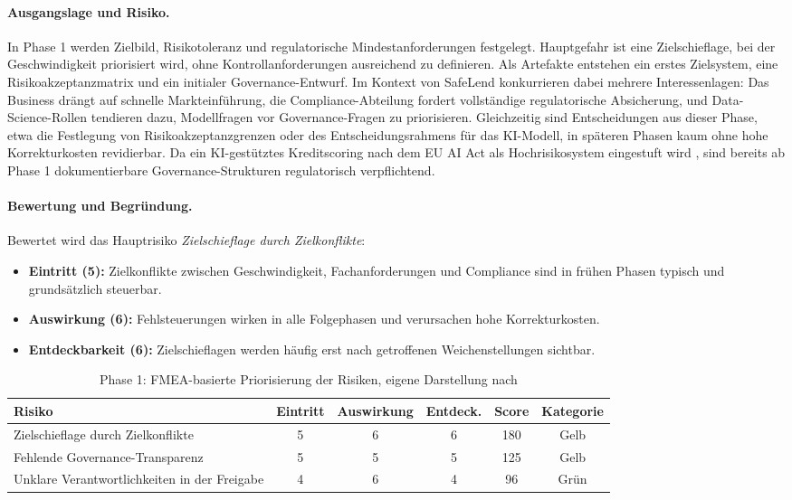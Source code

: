 \paragraph*{Ausgangslage und Risiko.}
In Phase 1 werden Zielbild, Risikotoleranz und regulatorische Mindestanforderungen festgelegt.
Hauptgefahr ist eine Zielschieflage, bei der Geschwindigkeit priorisiert wird,
ohne Kontrollanforderungen ausreichend zu definieren.
Als Artefakte entstehen ein erstes Zielsystem, eine Risikoakzeptanzmatrix und ein initialer Governance-Entwurf.
Im Kontext von SafeLend konkurrieren dabei mehrere Interessenlagen:
Das Business drängt auf schnelle Markteinführung,
die Compliance-Abteilung fordert vollständige regulatorische Absicherung,
und Data-Science-Rollen tendieren dazu, Modellfragen vor Governance-Fragen zu priorisieren.
Gleichzeitig sind Entscheidungen aus dieser Phase, etwa die Festlegung von Risikoakzeptanzgrenzen
oder des Entscheidungsrahmens für das KI-Modell,
in späteren Phasen kaum ohne hohe Korrekturkosten revidierbar.
Da ein KI-gestütztes Kreditscoring nach dem EU AI Act als Hochrisikosystem eingestuft wird \cite{EUAIAct2024},
sind bereits ab Phase 1 dokumentierbare Governance-Strukturen regulatorisch verpflichtend.

\paragraph*{Bewertung und Begründung.}
Bewertet wird das Hauptrisiko \textit{Zielschieflage durch Zielkonflikte}:
\begin{itemize}
  \item \textbf{Eintritt (5):} Zielkonflikte zwischen Geschwindigkeit, Fachanforderungen und Compliance sind in frühen Phasen typisch und grundsätzlich steuerbar.
  \item \textbf{Auswirkung (6):} Fehlsteuerungen wirken in alle Folgephasen und verursachen hohe Korrekturkosten.
  \item \textbf{Entdeckbarkeit (6):} Zielschieflagen werden häufig erst nach getroffenen Weichenstellungen sichtbar.
\end{itemize}

\begin{table}[!htbp]
\centering
\begin{tabular}{|p{5.5cm}|c|c|c|c|c|}
\hline
\textbf{Risiko} & \textbf{Eintritt} & \textbf{Auswirkung} & \textbf{Entdeck.} & \textbf{Score} & \textbf{Kategorie} \\
\hline
Zielschieflage durch Zielkonflikte & 5 & 6 & 6 & 180 & Gelb \\
Fehlende Governance-Transparenz & 5 & 5 & 5 & 125 & Gelb \\
Unklare Verantwortlichkeiten in der Freigabe & 4 & 6 & 4 & 96 & Grün \\
\hline
\end{tabular}
\caption{Phase 1: FMEA-basierte Priorisierung der Risiken, eigene Darstellung nach \cite{Bundesministerium_2018}}
\label{tab:cs1_phase1_risiken}
\end{table}

